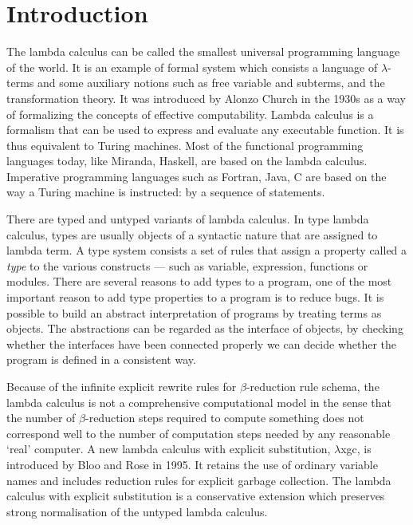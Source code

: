 \chapter*{Introduction}

The lambda calculus can be called the smallest universal programming language of the world\cite{rojas1997}. It is an example of formal system which consists a language of $\lambda$-terms and some auxiliary notions such as free variable and subterms, and the transformation theory. It was introduced by Alonzo Church in the 1930s as a way of formalizing the concepts of effective computability. Lambda calculus is a formalism that can be used to express and evaluate any executable function. It is thus equivalent to Turing machines. Most of the functional programming languages today, like Miranda, Haskell, are based on the lambda calculus. Imperative programming languages such as Fortran, Java, C are based on the way a Turing machine is instructed: by a sequence of statements. 

There are typed and untyped variants of lambda calculus. In type lambda calculus, types are usually objects of a syntactic nature that are assigned to lambda term. A type system consists a set of rules that assign a property called a \textit{type} to the various constructs --- such as variable, expression, functions or modules. There are several reasons to add types to a program, one of the most important reason to add type properties to a program is to reduce bugs. It is possible to build an abstract interpretation of programs by treating terms as objects. The abstractions can be regarded as the interface of objects, by checking whether the interfaces have been connected properly we can decide whether the program is defined in a consistent way.

Because of the infinite explicit rewrite rules for $\beta$-reduction rule schema, the lambda calculus is not a comprehensive computational model in the sense that the number of $\beta$-reduction steps required to compute something does not correspond well to the number of computation steps needed by any reasonable `real' computer\cite{bloo1995preservation}. A new lambda calculus with explicit substitution, $\lambda$xgc, is introduced by Bloo and Rose\cite{bloo1995preservation} in 1995. It retains the use of ordinary variable names and includes reduction rules for explicit garbage collection. The lambda calculus with explicit substitution is a conservative extension which preserves strong normalisation of the untyped lambda calculus.

